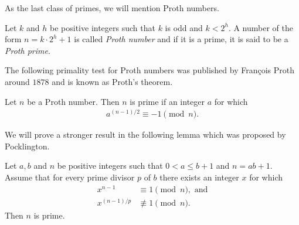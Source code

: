 \documentclass{subfiles}
\begin{document}
	As the last class of primes, we will mention Proth numbers.

		\begin{definition}
			Let $k$ and $h$ be positive integers such that $k$ is odd and $k < 2^h$. A number of the form $n=k \cdot 2^h +1$ is called \textit{Proth number} and if it is a prime, it is said to be a \textit{Proth prime}.
		\end{definition}

	The following primality test for Proth numbers was published by Fran\c cois Proth around $1878$ and is known as Proth's theorem.

		\begin{theorem}
			Let $n$ be a Proth number. Then $n$ is prime if an integer $a$ for which
				\begin{align*}
					a^{(n-1)/2} \equiv -1 \pmod n.
				\end{align*}
		\end{theorem}

	We will prove a stronger result in the following lemma which was proposed by Pocklington.

		\begin{lemma}
			Let $a, b$ and $n$  be positive integers such that $0<a \leq b+1$ and $n=ab+1$. Assume that for every prime divisor $p$ of $b$ there exists an integer $x$ for which
				\begin{align*}
					x^{n-1} &\equiv 1 \pmod n, \text{ and}\\
					x^{(n-1)/p} &\not \equiv 1 \pmod n.
				\end{align*}
			Then $n$ is prime.
		\end{lemma}
\end{document}
